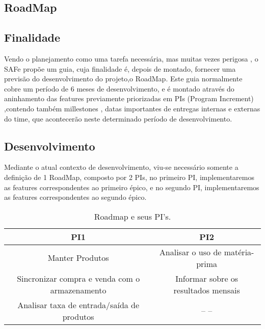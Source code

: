 \begin{appendices}
\chapter{RoadMap}

\section{Finalidade}
Vendo o planejamento como uma tarefa necessária, mas muitas vezes perigosa
, o SAFe propõe um guia, cuja finalidade é, depois de montado, fornecer uma
previsão do desenvolvimento do projeto,o RoadMap.
  Este guia normalmente cobre um período de 6 meses de desenvolvimento, e é montado
através do aninhamento das features previamente priorizadas em PIs (Program Increment)
,contendo também  millestones , datas importantes de
entregas internas e externas do time, que acontecerão neste determinado período de desenvolvimento.

\section{Desenvolvimento}
Mediante o atual contexto de desenvolvimento, viu-se necessário somente a definição de 1 RoadMap,
composto por 2 PIs, no primeiro PI, implementaremos as features correspondentes ao primeiro épico,
e no segundo PI, implementaremos as features correspondentes ao segundo épico.


\begin{table}[htb]
    \centering
    \begin{tabular}{| c | c |}
        \hline
        PI1          & PI2                                        \\ \hline
        Manter Produtos          & Analisar o uso de matéria-prima                                                     \\ \hline
        Sincronizar compra e venda com o armazenamento             & Informar sobre os resultados mensais                         \\ \hline
        Analisar taxa de entrada/saída de produtos           & -- --  \\ \hline
    \end{tabular}
    \caption{Roadmap e seus PI's.}
    \end{table}                    
\end{appendices}                                                     